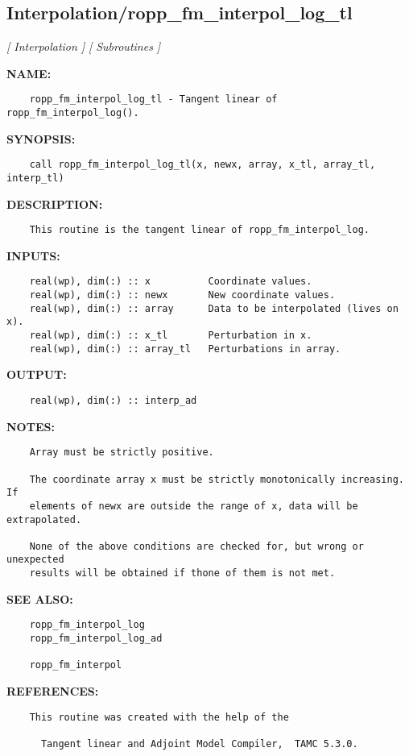 \subsection{Interpolation/ropp\_fm\_interpol\_log\_tl}
\textsl{[ Interpolation ]}
\textsl{[ Subroutines ]}

\label{ch:robo53}
\label{ch:Interpolation_ropp_fm_interpol_log_tl}
\textbf{NAME:}\hspace{0.08in}\begin{Verbatim}
    ropp_fm_interpol_log_tl - Tangent linear of ropp_fm_interpol_log().
\end{Verbatim}
\textbf{SYNOPSIS:}\hspace{0.08in}\begin{Verbatim}
    call ropp_fm_interpol_log_tl(x, newx, array, x_tl, array_tl, interp_tl)
\end{Verbatim}
\textbf{DESCRIPTION:}\hspace{0.08in}\begin{Verbatim}
    This routine is the tangent linear of ropp_fm_interpol_log.
\end{Verbatim}
\textbf{INPUTS:}\hspace{0.08in}\begin{Verbatim}
    real(wp), dim(:) :: x          Coordinate values.
    real(wp), dim(:) :: newx       New coordinate values.
    real(wp), dim(:) :: array      Data to be interpolated (lives on x).
    real(wp), dim(:) :: x_tl       Perturbation in x.
    real(wp), dim(:) :: array_tl   Perturbations in array.
\end{Verbatim}
\textbf{OUTPUT:}\hspace{0.08in}\begin{Verbatim}
    real(wp), dim(:) :: interp_ad
\end{Verbatim}
\textbf{NOTES:}\hspace{0.08in}\begin{Verbatim}
    Array must be strictly positive.

    The coordinate array x must be strictly monotonically increasing. If
    elements of newx are outside the range of x, data will be extrapolated.

    None of the above conditions are checked for, but wrong or unexpected
    results will be obtained if thone of them is not met. 
\end{Verbatim}
\textbf{SEE ALSO:}\hspace{0.08in}\begin{Verbatim}
    ropp_fm_interpol_log
    ropp_fm_interpol_log_ad

    ropp_fm_interpol
\end{Verbatim}
\textbf{REFERENCES:}\hspace{0.08in}\begin{Verbatim}
    This routine was created with the help of the 

      Tangent linear and Adjoint Model Compiler,  TAMC 5.3.0.
\end{Verbatim}

